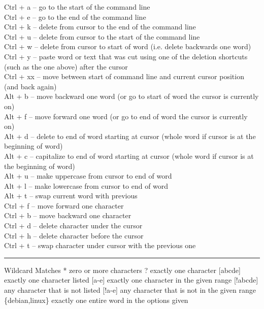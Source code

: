 \documentclass[11pt]{article}
\begin{document}
Ctrl + a -- go to the start of the command line\\
Ctrl + e -- go to the end of the command line\\
Ctrl + k -- delete from cursor to the end of the command line\\
Ctrl + u -- delete from cursor to the start of the command line\\
Ctrl + w -- delete from cursor to start of word (i.e. delete backwards
one word)\\
Ctrl + y -- paste word or text that was cut using one of the deletion
shortcuts (such as the one above) after the cursor\\
Ctrl + xx -- move between start of command line and current cursor
position (and back again)\\
Alt + b -- move backward one word (or go to start of word the cursor is
currently on)\\
Alt + f -- move forward one word (or go to end of word the cursor is
currently on)\\
Alt + d -- delete to end of word starting at cursor (whole word if
cursor is at the beginning of word)\\
Alt + c -- capitalize to end of word starting at cursor (whole word if
cursor is at the beginning of word)\\
Alt + u -- make uppercase from cursor to end of word\\
Alt + l -- make lowercase from cursor to end of word\\
Alt + t -- swap current word with previous\\
Ctrl + f -- move forward one character\\
Ctrl + b -- move backward one character\\
Ctrl + d -- delete character under the cursor\\
Ctrl + h -- delete character before the cursor\\
Ctrl + t -- swap character under cursor with the previous one

\begin{center}\rule{0.5\linewidth}{\linethickness}\end{center}

Wildcard Matches * zero or more characters ? exactly one character
{[}abcde{]} exactly one character listed {[}a-e{]} exactly one character
in the given range {[}!abcde{]} any character that is not listed
{[}!a-e{]} any character that is not in the given range \{debian,linux\}
exactly one entire word in the options given
\end{document}
